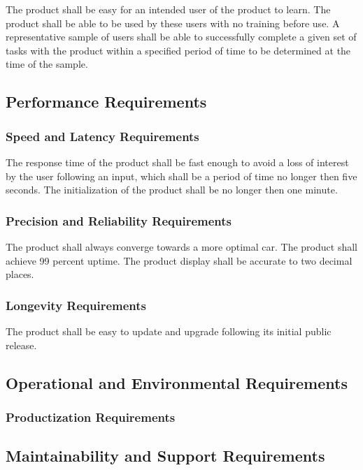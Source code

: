 \documentclass[12pt, titlepage]{article}
\begin{document}
The product shall be easy for an intended user of the product to learn. The 
product shall be able to be used by these users with no training before use. A 
representative sample of users shall be able to successfully complete a given 
set of tasks with the product within a specified period of time to be determined 
at the time of the sample.

\subsection{Performance Requirements}

\subsubsection{Speed and Latency Requirements}

The response time of the product shall be fast enough to avoid a loss of 
interest by the user following an input, which shall be a period of time no 
longer then five seconds. The initialization of the product shall be no longer 
then one minute.

\subsubsection{Precision and Reliability Requirements}

The product shall always converge towards a more optimal car. The product shall 
achieve 99 percent uptime. The product display shall be accurate to two decimal 
places.

\subsubsection{Longevity Requirements}

The product shall be easy to update and upgrade following its initial public 
release. 

\subsection{Operational and Environmental Requirements}

\subsubsection{Productization Requirements}

\subsection{Maintainability and Support Requirements}
\end{document}
